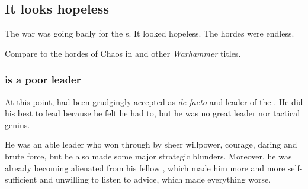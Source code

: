 








\subsection{It looks hopeless}
The war was going badly for the \Miithian s. 
It looked hopeless. 
The \bane{} hordes were endless. 

Compare to the hordes of Chaos in \cite{RPG:Warhammer:HighElves} and other \emph{Warhammer} titles. 




\subsubsection{\Ishnaruchaefir{} is a poor leader}
At this point, \Ishnaruchaefir{} had been grudgingly accepted as \emph{de facto} \dragonlord{} and leader of the \dragons.
He did his best to lead because he felt he had to, but he was no great leader nor tactical genius. 

He was an able leader who won through by sheer willpower, courage, daring and brute force, but he also made some major strategic blunders. 
Moreover, he was already becoming alienated from his fellow \dragons{}, which made him more and more self-sufficient and unwilling to listen to advice, which made everything worse. 





